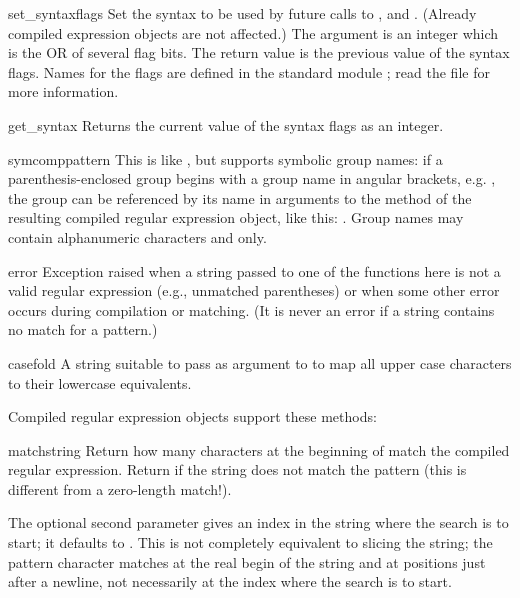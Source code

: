 \begin{funcdesc}{set_syntax}{flags}
  Set the syntax to be used by future calls to ,
   and .  (Already compiled expression objects
  are not affected.)  The argument is an integer which is the OR of
  several flag bits.  The return value is the previous value of
  the syntax flags.  Names for the flags are defined in the standard
  module ; read the file  for
  more information.
\end{funcdesc}

\begin{funcdesc}{get_syntax}{}
  Returns the current value of the syntax flags as an integer.
\end{funcdesc}

\begin{funcdesc}{symcomp}{pattern}
This is like , but supports symbolic group names: if a
parenthesis-enclosed group begins with a group name in angular
brackets, e.g. , the group can
be referenced by its name in arguments to the  method of
the resulting compiled regular expression object, like this:
.  Group names may contain alphanumeric characters
and  only.
\end{funcdesc}

\begin{excdesc}{error}
  Exception raised when a string passed to one of the functions here
  is not a valid regular expression (e.g., unmatched parentheses) or
  when some other error occurs during compilation or matching.  (It is
  never an error if a string contains no match for a pattern.)
\end{excdesc}

\begin{datadesc}{casefold}
A string suitable to pass as  argument to
 to map all upper case characters to their lowercase
equivalents.
\end{datadesc}

\noindent
Compiled regular expression objects support these methods:

\renewcommand{\indexsubitem}{(regex method)}
\begin{funcdesc}{match}{string}
  Return how many characters at the beginning of  match
  the compiled regular expression.  Return  if the string
  does not match the pattern (this is different from a zero-length
  match!).
  
  The optional second parameter  gives an index in the string
  where the search is to start; it defaults to .  This is not
  completely equivalent to slicing the string; the  pattern
  character matches at the real begin of the string and at positions
  just after a newline, not necessarily at the index where the search
  is to start.
\end{funcdesc}

